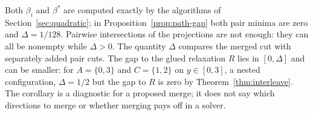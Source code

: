 Both $\beta_i$ and $\beta^\ast$ are computed exactly by the algorithms of
Section~\ref{sec:quadratic}; in Proposition~\ref{prop:path-gap} both pair
minima are zero and $\Delta=1/128$. Pairwise intersections of the
projections are not enough: they can all be nonempty while $\Delta>0$.
The quantity $\Delta$ compares the merged cut with separately added pair
cuts. The gap to the glued relaxation $R$ lies in $[0,\Delta]$ and can be
smaller: for $A=\{0,3\}$ and $C=\{1,2\}$ on $y\in[0,3]$, a nested
configuration, $\Delta=1/2$ but the gap to $R$ is zero by
Theorem~\ref{thm:interleave}. The corollary is a diagnostic for a proposed
merge; it does not say which directions to merge or whether merging pays
off in a solver.
